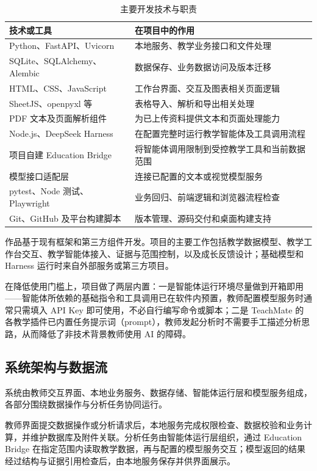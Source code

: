 \documentclass[11pt,a4paper,fontset=none]{ctexart}
\begin{document}
\begin{table}[htbp]
\centering
\small
\begin{tabularx}{\textwidth}{@{}L{4.6cm}Y@{}}
\toprule
\textbf{技术或工具} & \textbf{在项目中的作用} \\
\midrule
Python、FastAPI、Uvicorn & 本地服务、教学业务接口和文件处理 \\
SQLite、SQLAlchemy、Alembic & 数据保存、业务数据访问及版本迁移 \\
HTML、CSS、JavaScript & 工作台界面、交互及图表相关页面逻辑 \\
SheetJS、openpyxl 等 & 表格导入、解析和导出相关处理 \\
PDF 文本及页面解析组件 & 为已上传资料提供文本和页面处理能力 \\
Node.js、DeepSeek Harness & 在配置完整时运行教学智能体及工具调用流程 \\
项目自建 Education Bridge & 将智能体调用限制到受控教学工具和当前数据范围 \\
模型接口适配层 & 连接已配置的文本或视觉模型服务 \\
pytest、Node 测试、Playwright & 业务回归、前端逻辑和浏览器流程检查 \\
Git、GitHub 及平台构建脚本 & 版本管理、源码交付和桌面构建支持 \\
\bottomrule
\end{tabularx}
\caption{主要开发技术与职责}
\end{table}

作品基于现有框架和第三方组件开发。项目的主要工作包括教学数据模型、教学工作台交互、教学智能体接入、证据与范围控制，以及成长反馈设计；基础模型和 Harness 运行时来自外部服务或第三方项目。

在降低使用门槛上，项目做了两层内置：一是智能体运行环境尽量做到开箱即用——智能体所依赖的基础指令和工具调用已在软件内预置，教师配置模型服务时通常只需填入 API Key 即可使用，不必自行编写命令或脚本；二是 TeachMate 的各教学插件已内置任务提示词（prompt），教师发起分析时不需要手工描述分析思路，从而降低了非技术背景教师使用 AI 的障碍。

\subsection{系统架构与数据流}

系统由教师交互界面、本地业务服务、数据存储、智能体运行层和模型服务组成，各部分围绕数据操作与分析任务协同运行。

教师界面提交数据操作或分析请求后，本地服务完成权限检查、数据校验和业务计算，并维护数据库及附件关联。分析任务由智能体运行层组织，通过 Education Bridge 在指定范围内读取教学数据，再与配置的模型服务交互；模型返回的结果经过结构与证据引用检查后，由本地服务保存并供界面展示。
\end{document}
